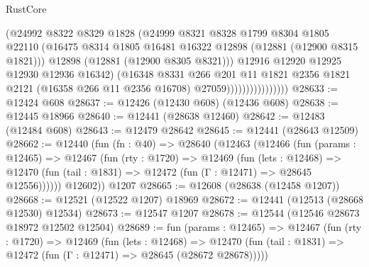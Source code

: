 \begin{lexlean}{RustCore}
\begin{coremodule}
                                  (@24992
                                    @8322
                                    @8329
                                    @1828
                                    (@24999
                                      @8321
                                      @8328
                                      @1799
                                      @8304
                                      @1805
                                      @22110
                                      (@16475
                                        @8314
                                        @1805
                                        @16481
                                        @16322
                                        @12898
                                        (@12881 (@12900 @8315 @1821)))
                                      @12898
                                      (@12881 (@12900 @8305 @8321)))
                                    @12916
                                    @12920
                                    @12925
                                    @12930
                                    @12936
                                    @16342)
                                  (@16348
                                    @8331
                                    @266
                                    @201
                                    @11
                                    @1821
                                    @2356
                                    @1821
                                    @2121
                                    (@16358 @266 @11 @2356 @16708)
                                    @27059))))))))))))))))
@28633 := @12424 @608
@28637 := @12426 (@12430 @608) (@12436 @608)
@28638 := @12445 @18966
@28640 := @12441 (@28638 @12460)
@28642 := @12483 (@12484 @608)
@28643 := @12479 @28642
@28645 := @12441 (@28643 @12509)
@28662 := @12440
    (fun (fn : @40) =>
    @28640
      (@12463
        (@12466
          (fun (params : @12465) =>
          @12467
            (fun (rty : @1720) =>
            @12469
              (fun (lets : @12468) =>
              @12470 (fun (tail : @1831) => @12472 (fun (Γ : @12471) => @28645 @12556))))))
        @12602))
    @1207
@28665 := @12608 (@28638 (@12458 @1207))
@28668 := @12521 (@12522 @1207) @18969
@28672 := @12441 (@12513 (@28668 @12530) @12534)
@28673 := @12547 @1207
@28678 := @12544 (@12546 @28673 @18972 @12502 @12504)
@28689 := fun (params : @12465) =>
  @12467
    (fun (rty : @1720) =>
    @12469
      (fun (lets : @12468) =>
      @12470 (fun (tail : @1831) => @12472 (fun (Γ : @12471) => @28645 (@28672 @28678)))))

\end{coremodule}
\end{lexlean}

